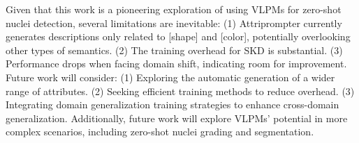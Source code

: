 \documentclass[journal,twoside,web]{ieeecolor}
\begin{document}
Given that this work is a pioneering exploration of using VLPMs for zero-shot nuclei detection, several limitations are inevitable: (1) Attriprompter currently generates descriptions only related to [shape] and [color], potentially overlooking other types of semantics. (2) The training overhead for SKD is substantial. (3) Performance drops when facing domain shift, indicating room for improvement. Future work will consider: (1) Exploring the automatic generation of a wider range of attributes. (2) Seeking efficient training methods to reduce overhead. (3) Integrating domain generalization training strategies to enhance cross-domain generalization. Additionally, future work will explore VLPMs' potential in more complex scenarios, including zero-shot nuclei grading and segmentation.



\normalem


\end{document}
